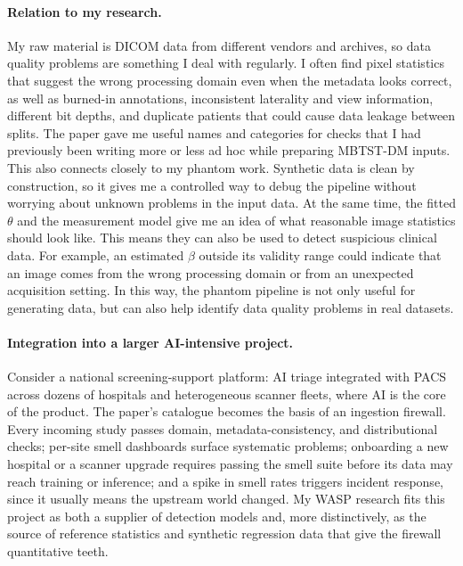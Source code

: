 \documentclass[11pt,a4paper]{article}
\begin{document}
\paragraph{Relation to my research.}
My raw material is DICOM data from different vendors and archives, so data quality problems are something I deal with regularly. I often find pixel statistics that suggest the wrong processing domain even when the metadata looks correct, as well as burned-in annotations, inconsistent laterality and view information, different bit depths, and duplicate patients that could cause data leakage between splits. The paper gave me useful names and categories for checks that I had previously been writing more or less ad hoc while preparing MBTST-DM inputs. This also connects closely to my phantom work. Synthetic data is clean by construction, so it gives me a controlled way to debug the pipeline without worrying about unknown problems in the input data. At the same time, the fitted $\theta$ and the measurement model give me an idea of what reasonable image statistics should look like. This means they can also be used to detect suspicious clinical data. For example, an estimated $\beta$ outside its validity range could indicate that an image comes from the wrong processing domain or from an unexpected acquisition setting. In this way, the phantom pipeline is not only useful for generating data, but can also help identify data quality problems in real datasets.


\paragraph{Integration into a larger AI-intensive project.}
Consider a national screening-support platform: AI triage integrated with PACS across dozens of hospitals and heterogeneous scanner fleets, where AI is the core of the product. The paper's catalogue becomes the basis of an ingestion firewall. Every incoming study passes domain, metadata-consistency, and distributional checks; per-site smell dashboards surface systematic problems; onboarding a new hospital or a scanner upgrade requires passing the smell suite before its data may reach training or inference; and a spike in smell rates triggers incident response, since it usually means the upstream world changed. My WASP research fits this project as both a supplier of detection models and, more distinctively, as the source of reference statistics and synthetic regression data that give the firewall quantitative teeth.
\end{document}
